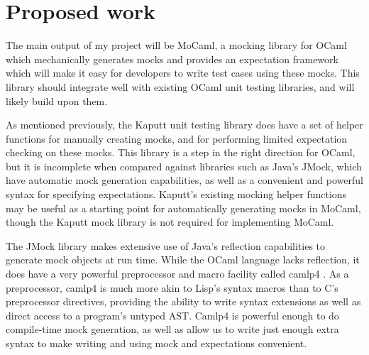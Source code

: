 \documentclass[proposal]{softeng}
\begin{document}
\section{Proposed work}


The main output of my project will be MoCaml, a mocking library for
OCaml which mechanically generates mocks and provides an expectation
framework which will make it easy for developers to write test cases
using these mocks. This library should integrate well with existing
OCaml unit testing libraries, and will likely build upon them.

As mentioned previously, the Kaputt unit testing library does have a
set of helper functions for manually creating mocks, and for
performing limited expectation checking on these mocks. This library
is a step in the right direction for OCaml, but it is incomplete when
compared against libraries such as Java's JMock, which have automatic
mock generation capabilities, as well as a convenient and powerful
syntax for specifying expectations. Kaputt's existing mocking helper
functions may be useful as a starting point for automatically
generating mocks in MoCaml, though the Kaputt mock library is not
required for implementing MoCaml.

The JMock library makes extensive use of Java's reflection
capabilities to generate mock objects at run time. While the OCaml
language lacks reflection, it does have a very powerful preprocessor
and macro facility called camlp4 \cite{www:reading_camlp4}. As a
preprocessor, camlp4 is much more akin to Lisp's syntax macros than to
C's preprocessor directives, providing the ability to write syntax
extensions as well as direct access to a program's untyped AST. Camlp4
is powerful enough to do compile-time mock generation, as well as
allow us to write just enough extra syntax to make writing and using
mock and expectations convenient.
\end{document}
